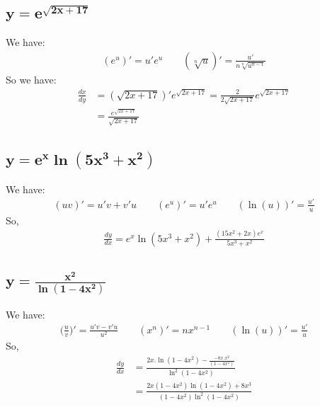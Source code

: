 \documentclass{article}
\begin{document}
\begin{multicols}{2}
\subsection{$\mathbf{y = e^{\sqrt{2x+17}}}$}
\noindent We have:
\begin{align*}
    (e^u)'=u'e^u \qquad  (\sqrt[n]{u})' = \frac{u'}{n\sqrt[n]{u^{n-1}}}
\end{align*}
So we have:
\begin{align*}
    \frac{dx}{dy} &= (\sqrt{2x+17})'e^{\sqrt{2x+17}} = \frac{2}{2\sqrt{2x+17}}e^{\sqrt{2x+17}} \\
                &=\frac{e^{\sqrt{2x+17}}}{\sqrt{2x+17}}
\end{align*}

\subsection{$\mathbf{y=e^x\ln(5x^3+x^2)}$}
\noindent We have:
\begin{align*}
    (uv)'=u'v +v'u \qquad (e^u)'=u'e^u \qquad (\ln(u))'=\frac{u'}{u}
\end{align*}
So,
\begin{align*}
    \frac{dy}{dx} = e^x\ln(5x^3+x^2) + \frac{(15x^2 + 2x)e^x}{5x^3 + x^2}
\end{align*}

\subsection{$\mathbf{y = \frac{x^2}{\ln(1-4x^2)}}$}
\noindent We have:
\begin{align*}
    \Big(\frac{u}{v}\Big)' = \frac{u'v-v'u}{u^2} \qquad (x^n)'= nx^{n-1} \qquad (\ln(u))'=\frac{u'}{u}
\end{align*}
So,
\begin{align*}
    \frac{dy}{dx} &= \frac{2x.\ln(1-4x^2)-\frac{-8x.x^2}{(1-4x^2)}}{\ln^2(1-4x^2)} \\
                &= \frac{2x(1-4x^2)\ln(1-4x^2)+8x^3}{(1-4x^2)\ln^2(1-4x^2)}
\end{align*}

\end{multicols}
\end{document}
